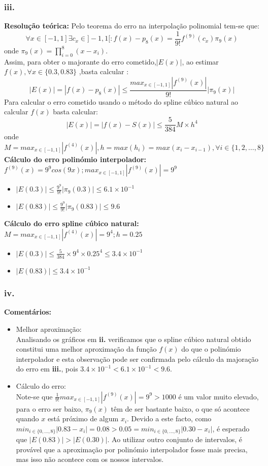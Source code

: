 \documentclass{article}
\begin{document}
\subsubsection*{iii.}
\textbf{Resolução teórica:} Pelo teorema do erro na interpolação polinomial  tem-se que:
\[
\forall x  \in  [-1,1] \exists c_{x}  \in  ]-1,1[ :   f(x)-p_{8}(x)= \frac{1}{9!}f^{(9)}(c_{x})\pi_{9}(x)
\]
onde $\pi_{9}(x)= \prod_{i = 0}^{8}(x-x_{i})$.\\
Assim, para obter o majorante do erro cometido,$|E(x)|$, ao estimar $f(x), \forall x \in \{0.3,0.83\}$ ,basta calcular :
\[
|E(x)|=|f(x)-p_{8}(x)| \leq \frac{max_{x \in [-1,1]} |f^{(9)}(x)|}{9!}|\pi_{9}(x)|
\]
Para calcular o erro cometido usando o método do spline cúbico natural ao calcular $f(x)$ basta calcular:
\[
|E(x)|= |f(x)-S(x)| \leq \frac{5}{384}M\times h^{4}
\]
onde $M = max_{x\in[-1,1]}|f^{(4)}(x)|, h= max(h_{i}) = max(x_{i}-x_{i-1}), \forall i \in \{1,2,\dots,8\}$
\\[5mm]
\textbf{Cálculo do erro polinómio interpolador:}\\[2mm]
$f^{(9)}(x) = 9^{9}cos(9x) ; max_{x \in [-1,1]} |f^{(9)}(x)| = 9^{9}$
\begin{itemize}
  \item{$|E(0.3)| \leq \frac{9^{9}}{9!}|\pi_{9}(0.3)| \leq 6.1\times10^{-1}$}
  \item{$|E(0.83)| \leq \frac{9^{9}}{9!}|\pi_{9}(0.83)| \leq 9.6$}
\end{itemize}
\textbf{Cálculo do erro spline cúbico natural:}\\
$M = max_{x\in[-1,1]}|f^{(4)}(x)| = 9^{4}  ; h = 0.25$
\begin{itemize}
  \item{$|E(0.3)| \leq \frac{5}{384}\times 9^{4} \times0.25^{4} \leq 3.4\times10^{-1}$}
  \item{$|E(0.83)| \leq  3.4\times10^{-1} $}
\end{itemize}
\subsubsection*{iv.}
\textbf{Comentários:}
\begin{itemize}
\item{Melhor aproximação:\\
Analisando os gráficos em \textbf{ii.}  verificamos que o spline cúbico natural obtido constitui uma melhor aproximação da função $f(x)$ do que o polinómio interpolador e esta observação pode ser confirmada pelo cálculo da majoração do erro em \textbf{iii.}, pois $3.4\times10^{-1}<6.1\times10^{-1}<9.6$.}
\item{Cálculo do erro:\\
Note-se que $\frac{1}{9!}max_{x \in [-1,1]} |f^{(9)}(x)| = 9^{9}>1000$ é um valor muito elevado, para o erro ser baixo, $\pi_9(x)$ têm de ser bastante baixo, o que só acontece quando $x$ está próximo de algum $x_i$. Devido a este facto, como $min_{i\in\{0,...,8\}}|0.83-x_i|=0.08>0.05=min_{i\in\{0,...,8\}}|0.30-x_i|$, é esperado que $|E(0.83)|>|E(0.30)|$. Ao utilizar outro conjunto de intervalos, é provável que a aproximação por polinómio interpolador fosse mais precisa, mas isso não acontece com os nossos intervalos.}
\end{itemize}
\end{document}
